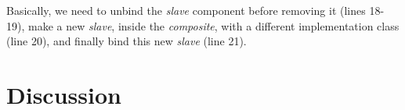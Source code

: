 	\noindent Basically, we need to unbind the \textit{slave} component before removing it (lines 18-19), 
	make a new \textit{slave}, inside the \textit{composite}, with a different implementation class (line 20),
	and finally bind this new \textit{slave} (line 21). %
	
		
	

	
	
%	






	







\section{Discussion}
\label{sec:painlessdiscussion}




